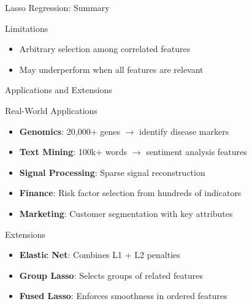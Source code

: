 \documentclass{beamer}
\begin{document}
\begin{frame}{Lasso Regression: Summary}
\begin{keypointsbox}{Limitations}
{\small
\begin{itemize}
\item Arbitrary selection among correlated features
\item May underperform when all features are relevant
\end{itemize}
}
\end{keypointsbox}
\end{frame}

\begin{frame}{Applications and Extensions}
\footnotesize
\begin{examplebox}{Real-World Applications}
{\small
\begin{itemize}
\item \textbf{Genomics}: 20,000+ genes $\to$ identify disease markers
\item \textbf{Text Mining}: 100k+ words $\to$ sentiment analysis features
\item \textbf{Signal Processing}: Sparse signal reconstruction
\item \textbf{Finance}: Risk factor selection from hundreds of indicators
\item \textbf{Marketing}: Customer segmentation with key attributes
\end{itemize}
}
\end{examplebox}

\begin{keypointsbox}{Extensions}
{\small
\begin{itemize}
\item \textbf{Elastic Net}: Combines L1 + L2 penalties
\item \textbf{Group Lasso}: Selects groups of related features
\item \textbf{Fused Lasso}: Enforces smoothness in ordered features
\end{itemize}
}
\end{keypointsbox}
\end{frame}
\end{document}
